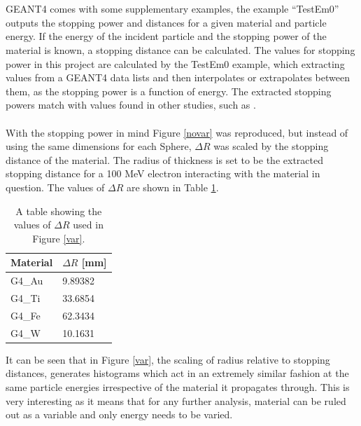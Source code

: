 \documentclass[12pt,a4paper]{article}
\begin{document}
\\\\
\noindent GEANT4 comes with some supplementary examples, the example ``TestEm0'' \cite{emo} outputs the stopping power and distances for a given material and particle energy. If the energy of the incident particle and the stopping power of the material is known, a stopping distance can be calculated. The values for stopping power in this project are calculated by the TestEm0 example, which extracting values from a GEANT4 data lists and then interpolates or extrapolates between them, as the stopping power is a function of energy. The extracted stopping powers match with values found in other studies, such as \cite{stpdat}.
\\\\
\noindent With the stopping power in mind Figure \ref{novar} was reproduced, but instead of using the same dimensions for each Sphere, $\Delta R$ was scaled by the stopping distance of the material. The radius of thickness is set to be the extracted stopping distance for a 100 MeV electron interacting with the material in question. The values of $\Delta R$ are shown in Table \ref{rs}.
\newpage
\begin{table}[h!]
\centering
\begin{tabular}{|l|l|}
\hline
Material & $\Delta R$ [mm] \\ \hline
G4\_Au &  9.89382\\ \hline
G4\_Ti &  33.6854\\ \hline
G4\_Fe &  62.3434\\ \hline
G4\_W &  10.1631\\ \hline
\end{tabular}
\caption{A table showing the values of $\Delta R$ used in Figure \ref{var}.}
\label{rs}
\end{table}
\noindent It can be seen that in Figure \ref{var}, the scaling of radius relative to stopping distances, generates histograms which act in an extremely similar fashion at the same particle energies irrespective of the material it propagates through. This is very interesting as it means that for any further analysis, material can be ruled out as a variable and only energy needs to be varied.
\\\\
\end{document}
